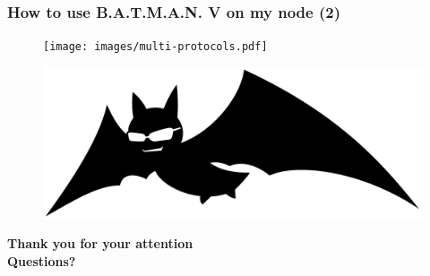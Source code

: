 \documentclass[slidestop]{beamer}
\begin{document}
\begin{frame}[c]
	\frametitle{How to use B.A.T.M.A.N. V on my node (2)}
	\begin{figure}
		\centering
		\texttt{[image: images/multi-protocols.pdf]}
	\end{figure}
\end{frame}

\begin{frame}[c]
	\begin{figure}
		\centering
		\includegraphics[scale=0.28]{ext_images/batlogo_transparent.pdf}
	\end{figure}
	\begin{center}
	\Large{\textbf{Thank you for your attention\\[1cm]
	Questions?}}
	\end{center}
\end{frame}
\end{document}

